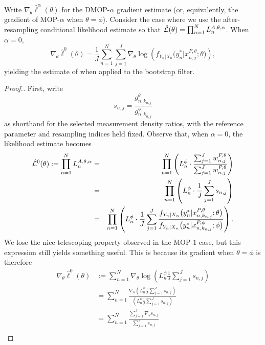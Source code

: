\documentclass[11pt]{article}
\theoremstyle{thmstylethree}%
\begin{document}
\begin{lem}
\label{lem:mop-0-formula}
Write $\nabla_\theta \hat\ell^\alpha(\theta)$ for the DMOP-$\alpha$ gradient estimate (or, equivalently, the gradient of MOP-$\alpha$ when $\theta=\phi$).
Consider the case where we use the after-resampling conditional likelihood estimate so that $\hat{\mathcal{L}}(\theta) = \prod_{n=1}^N L_n^{A, \theta, \alpha}$.
When $\alpha=0$,
    \begin{equation}
        \nabla_\theta \hat\ell^0(\theta) 
        = \frac{1}{J} \sum_{n=1}^N \sum_{j=1}^J \nabla_\theta \log\left(f_{Y_n|X_{n}}\big(y_n^*|x_{n,j}^{F, \theta}; \theta\big)\right),
    \end{equation}
    yielding the estimate of \cite{naesseth18} when applied to the bootstrap filter. 
\end{lem}
\begin{proof}[Proof.]
First, write
\begin{equation}
s_{n,j} = \frac{g_{n,k_{n,j}}^\theta}{g_{n,k_{n,j}}^\phi}
\end{equation}
as shorthand for the selected measurement density ratios, with the
reference parameter and resampling indices held fixed.
Observe that, when $\alpha=0$, the likelihood estimate becomes
\begin{eqnarray}
    \hat{\mathcal{L}}^0(\theta) := \prod_{n=1}^N L_n^{A, \theta, \alpha} &=& \prod_{n=1}^N\left(L_n^\phi \cdot \frac{\sum_{j=1}^J w_{n,j}^{F,\theta}}{\sum_{j=1}^J w_{n,j}^{P,\theta}}\right)
    \\
    &=& \prod_{n=1}^N\left(L_n^\phi \cdot \frac{1}{J}\sum_{j=1}^J s_{n,j}\right)
    \\
    &=& \prod_{n=1}^N\left(L_n^\phi \cdot \frac{1}{J}\sum_{j=1}^J \frac{f_{Y_n|X_n}\big(y_n^*|x_{n,k_{n,j}}^{P, \theta};\theta\big)}{f_{Y_n|X_n}\big(y_n^*|x_{n,k_{n,j}}^{P, \phi};\phi\big)}\right).
\end{eqnarray}
We lose the nice telescoping property observed in the MOP-$1$ case, but this expression still yields something useful. 
This is because its gradient when $\theta=\phi$ is therefore 
\begin{align}
    \nabla_\theta \hat{\ell}^0(\theta) &:= \sum_{n=1}^N \nabla_\theta \log\left(L_n^\phi \frac{1}{J} \sum_{j=1}^J s_{n,j}\right) \\
    &= \sum_{n=1}^N \frac{\nabla_\theta \left(L_n^\phi \frac{1}{J} \sum_{j=1}^J s_{n,j}\right)}{\left(L_n^\phi \frac{1}{J} \sum_{j=1}^J s_{n,j}\right)} \\
    &= \sum_{n=1}^N \frac{\sum_{j=1}^J \nabla_\theta s_{n,j}}{\sum_{j=1}^J s_{n,j}} \\

\end{align}
\end{proof}
\end{document}
